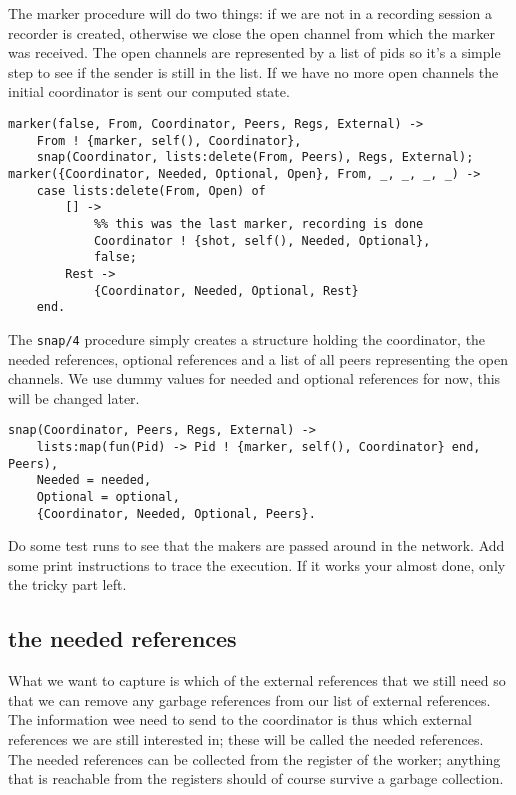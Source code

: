 \documentclass[a4paper,11pt]{article}
\begin{document}
The marker procedure will do two things: if we are not in a recording
session a recorder is created, otherwise we close the open channel from
which the marker was received. The open channels are represented by a
list of pids so it's a simple step to see if the sender is still in the
list. If we have no more open channels the initial coordinator is sent
our computed state.

\begin{verbatim}
marker(false, From, Coordinator, Peers, Regs, External) ->
    From ! {marker, self(), Coordinator},
    snap(Coordinator, lists:delete(From, Peers), Regs, External);
marker({Coordinator, Needed, Optional, Open}, From, _, _, _, _) ->
    case lists:delete(From, Open) of
        [] ->
            %% this was the last marker, recording is done
            Coordinator ! {shot, self(), Needed, Optional},
            false;
        Rest ->
            {Coordinator, Needed, Optional, Rest}
    end.
\end{verbatim}

The {\tt snap/4} procedure simply creates a structure holding the
coordinator, the needed references, optional references and a list of
all peers representing the open channels. We use dummy values for
needed and optional references for now, this will be changed later.

\begin{verbatim}
snap(Coordinator, Peers, Regs, External) ->
    lists:map(fun(Pid) -> Pid ! {marker, self(), Coordinator} end, Peers),
    Needed = needed,
    Optional = optional,
    {Coordinator, Needed, Optional, Peers}.
\end{verbatim}

Do some test runs to see that the makers are passed around in the
network. Add some print instructions to trace the execution. If it
works your almost done, only the tricky part left.

\subsection{the needed references}

What we want to capture is which of the external references that we
still need so that we can remove any garbage references from our list
of external references. The information wee need to send to the
coordinator is thus which external references we are still interested
in; these will be called the needed references. The needed references
can be collected from the register of the worker; anything that is
reachable from the registers should of course survive a garbage
collection.
\end{document}
